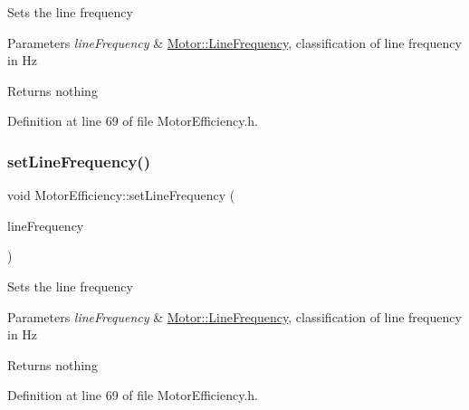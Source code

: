 Sets the line frequency


\begin{DoxyParams}{Parameters}
{\em line\+Frequency} & \hyperlink{class_motor_acee1bdf1b684ad36cb80dc2829d9fcee}{Motor\+::\+Line\+Frequency}, classification of line frequency in Hz\\
\hline
\end{DoxyParams}
\begin{DoxyReturn}{Returns}
nothing 
\end{DoxyReturn}


Definition at line 69 of file Motor\+Efficiency.\+h.

\mbox{\label{class_motor_efficiency_a993b09941d330d3a46e0d72bd6dc65bb}} 
\subsubsection{\texorpdfstring{set\+Line\+Frequency()}{setLineFrequency()}\hspace{0.1cm}{\footnotesize\ttfamily [3/3]}}
{\footnotesize\ttfamily void Motor\+Efficiency\+::set\+Line\+Frequency (\begin{DoxyParamCaption}\item[{\hyperlink{class_motor_acee1bdf1b684ad36cb80dc2829d9fcee}{Motor\+::\+Line\+Frequency}}]{line\+Frequency }\end{DoxyParamCaption})\hspace{0.3cm}{\ttfamily [inline]}}

Sets the line frequency


\begin{DoxyParams}{Parameters}
{\em line\+Frequency} & \hyperlink{class_motor_acee1bdf1b684ad36cb80dc2829d9fcee}{Motor\+::\+Line\+Frequency}, classification of line frequency in Hz\\
\hline
\end{DoxyParams}
\begin{DoxyReturn}{Returns}
nothing 
\end{DoxyReturn}


Definition at line 69 of file Motor\+Efficiency.\+h.

\mbox{\label{class_motor_efficiency_ad6a7b0eb436378f36ceb8a0cec121786}} 
